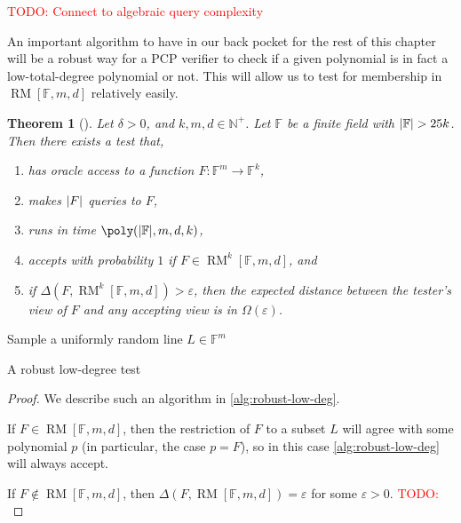 \documentclass[english,12pt]{reedthesis}
\theoremstyle{plain}
\newtheorem{thm}{Theorem}[section]
\theoremstyle{definition}
\theoremstyle{remark}
\DeclareMathOperator{\RM}{RM}
\DeclarePairedDelimiter{\abs}{\lvert}{\rvert}
\newcommand{\TODO}[1]{\textcolor{red}{TODO: #1}}
\begin{document}
\TODO{Connect to algebraic query complexity}

An important algorithm to have in our back pocket for the rest of this chapter
will be a robust way for a PCP verifier to check if a given polynomial is in
fact a low-total-degree polynomial or not. This will allow us to test for
membership in $\RM[\mathbb{F}, m, d]$ relatively easily.

\begin{thm}[{\cite[Prop.\ 5.7]{Par21}}]\label{thm:robust-low-deg}
  Let $\delta > 0$, and $k, m, d \in \mathbb{N}^{+}$. Let $\mathbb{F}$ be a finite field with
  $\abs{\mathbb{F}} > 25k$. Then there exists a test that,
  \begin{enumerate}
    \item has oracle access to a function $F\colon \mathbb{F}^{m} \rightarrow \mathbb{F}^{k}$,
    \item makes $\abs{F}$ queries to $F$,
    \item runs in time $\poly(\abs{\mathbb{F}}, m, d, k)$,
    \item accepts with probability $1$ if $F \in \RM^{k}[\mathbb{F}, m, d]$, and
    \item if $\Delta(F, \RM^{k}[\mathbb{F}, m, d]) > \varepsilon$, then the expected distance
          between the tester's view of $F$ and any accepting view is in $\Omega(\varepsilon)$.
  \end{enumerate}
\end{thm}

\begin{algorithm}[htbp]
  \KwOut{Whether $F \in \RM[\mathbb{F}, m, d]$}
  Sample a uniformly random line $L \in \mathbb{F}^{m}$\;
  \caption{A robust low-degree test~\cite[Prop.\ 5.7]{Par21}}\label{alg:robust-low-deg}
\end{algorithm}

\begin{proof}
  We describe such an algorithm in \cref{alg:robust-low-deg}.

  If $F \in \RM[\mathbb{F}, m, d]$, then the restriction of $F$ to a subset $L$
  will agree with some polynomial $p$ (in particular, the case $p = F$), so in
  this case \cref{alg:robust-low-deg} will always accept.

  If $F \notin \RM[\mathbb{F}, m, d]$, then $\Delta(F, \RM[\mathbb{F}, m, d]) = \varepsilon$ for
  some $\varepsilon > 0$. \TODO{}
\end{proof}
\end{document}
